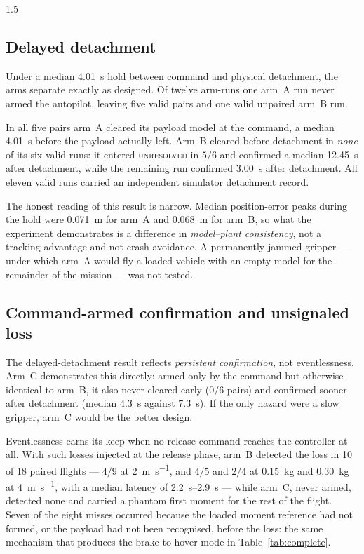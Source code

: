 \begin{spacing}{1.5}
\subsection{Delayed detachment}\label{sec:eval:delayed}

Under a median \SI{4.01}{\second} hold between command and physical detachment,
the arms separate exactly as designed. Of twelve arm-runs one arm~A run never
armed the autopilot, leaving five valid pairs and one valid unpaired arm~B run.

In all five pairs arm~A cleared its payload model at the command, a median
\SI{4.01}{\second} before the payload actually left. Arm~B cleared before
detachment in \emph{none} of its six valid runs: it entered \textsc{unresolved}
in $5/6$ and confirmed a median \SI{12.45}{\second} after detachment, while the
remaining run confirmed \SI{3.00}{\second} after detachment. All eleven valid
runs carried an independent simulator detachment record.

The honest reading of this result is narrow. Median position-error peaks during
the hold were \SI{0.071}{\meter} for arm~A and \SI{0.068}{\meter} for arm~B, so
what the experiment demonstrates is a difference in \emph{model--plant
consistency}, not a tracking advantage and not crash avoidance. A permanently
jammed gripper --- under which arm~A would fly a loaded vehicle with an empty
model for the remainder of the mission --- was not tested.

\subsection{Command-armed confirmation and unsignaled loss}\label{sec:eval:unsignaled}

The delayed-detachment result reflects \emph{persistent confirmation}, not
eventlessness. Arm~C demonstrates this directly: armed only by the command but
otherwise identical to arm~B, it also never cleared early ($0/6$ pairs) and
confirmed sooner after detachment (median \SI{4.3}{\second} against
\SI{7.3}{\second}). If the only hazard were a slow gripper, arm~C would be the
better design.

Eventlessness earns its keep when no release command reaches the controller at
all. With such losses injected at the release phase, arm~B detected the loss in
10 of 18 paired flights --- $4/9$ at \SI{2}{\meter\per\second}, and $4/5$ and
$2/4$ at \SI{0.15}{\kg} and \SI{0.30}{\kg} at \SI{4}{\meter\per\second}, with a
median latency of \SIrange{2.2}{2.9}{\second} --- while arm~C, never armed,
detected none and carried a phantom first moment for the rest of the flight.
Seven of the eight misses occurred because the loaded moment reference had not
formed, or the payload had not been recognised, before the loss: the same
mechanism that produces the brake-to-hover mode in
Table~\ref{tab:complete}.


\end{spacing}
